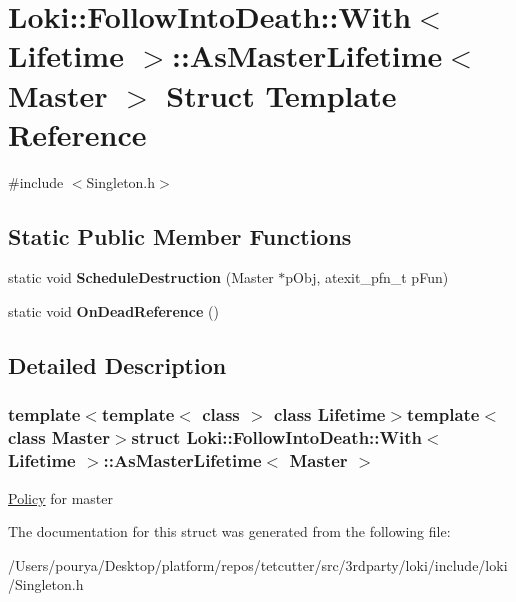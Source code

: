 \hypertarget{structLoki_1_1FollowIntoDeath_1_1With_1_1AsMasterLifetime}{}\section{Loki\+:\+:Follow\+Into\+Death\+:\+:With$<$ Lifetime $>$\+:\+:As\+Master\+Lifetime$<$ Master $>$ Struct Template Reference}
\label{structLoki_1_1FollowIntoDeath_1_1With_1_1AsMasterLifetime}


{\ttfamily \#include $<$Singleton.\+h$>$}

\subsection*{Static Public Member Functions}
\begin{DoxyCompactItemize}
\item 
\hypertarget{structLoki_1_1FollowIntoDeath_1_1With_1_1AsMasterLifetime_aab8622a6b436f51a721b48acf622c800}{}static void {\bfseries Schedule\+Destruction} (Master $\ast$p\+Obj, atexit\+\_\+pfn\+\_\+t p\+Fun)\label{structLoki_1_1FollowIntoDeath_1_1With_1_1AsMasterLifetime_aab8622a6b436f51a721b48acf622c800}

\item 
\hypertarget{structLoki_1_1FollowIntoDeath_1_1With_1_1AsMasterLifetime_a7a6d01c07aeb094a9870bf18bc4f49a8}{}static void {\bfseries On\+Dead\+Reference} ()\label{structLoki_1_1FollowIntoDeath_1_1With_1_1AsMasterLifetime_a7a6d01c07aeb094a9870bf18bc4f49a8}

\end{DoxyCompactItemize}


\subsection{Detailed Description}
\subsubsection*{template$<$template$<$ class $>$ class Lifetime$>$template$<$class Master$>$struct Loki\+::\+Follow\+Into\+Death\+::\+With$<$ Lifetime $>$\+::\+As\+Master\+Lifetime$<$ Master $>$}

\hyperlink{structPolicy}{Policy} for master 

The documentation for this struct was generated from the following file\+:\begin{DoxyCompactItemize}
\item 
/\+Users/pourya/\+Desktop/platform/repos/tetcutter/src/3rdparty/loki/include/loki/Singleton.\+h\end{DoxyCompactItemize}
